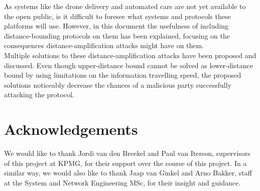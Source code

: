 \documentclass{article}
\begin{document}
As systems like the drone delivery and automated cars are not yet available to the open public, is it difficult to foresee what systems and protocols these platforms will use. However, in this document the usefulness of including distance-bounding protocols on them has been explained, focusing on the consequences distance-amplification attacks might have on them.\\

Multiple solutions to these distance-amplification attacks have been proposed and discussed. Even though upper-distance bound cannot be solved as lower-distance bound by using limitations on the information travelling speed, the proposed solutions noticeably decrease the chances of a malicious party successfully attacking the protocol.\\




















\section{Acknowledgements}
\label{sec:acknowledgements}

We would like to thank Jordi van den Breekel and Paul van Iterson, supervisors of this project at KPMG, for their support over the course of this project. In a similar way, we would also like to thank Jaap van Ginkel and Arno Bakker, staff at the System and Network Engineering MSc, for their insight and guidance.\\







\printbibliography


\end{document}
